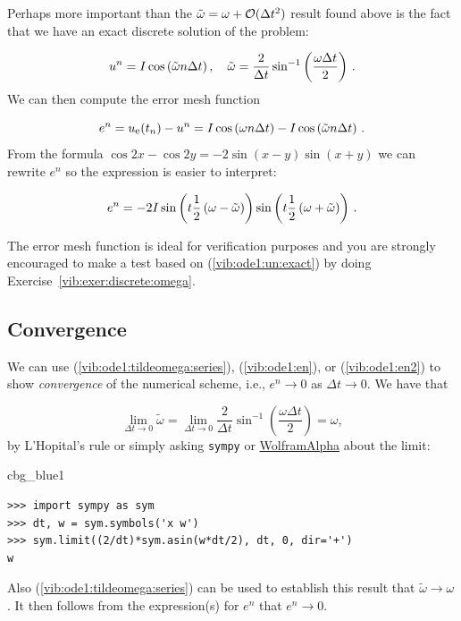 \documentclass[%
oneside,                 %
final,                   %
10pt]{article}
\newenvironment{_cod_tight}[1]{
   \def\FrameCommand{\colorbox{#1}}
   \FrameRule0.6pt\MakeFramed {\FrameRestore}\vskip3mm}
   {\vskip0mm\endMakeFramed}
\newenvironment{cod}[1]{
\bgroup\rmfamily
\fboxsep=0mm\relax
\begin{_cod_tight}{#1}
\list{}{\parsep=-2mm\parskip=0mm\topsep=0pt\leftmargin=2mm
\rightmargin=2\leftmargin\leftmargin=4pt\relax}
\item\relax}
{\endlist\end{_cod_tight}\egroup}
\begin{document}
Perhaps more important than the $\tilde\omega = \omega + {\cal O}(\Delta t^2)$
result found above is the fact that we have an exact discrete solution of
the problem:

\begin{equation}
u^n = I\cos\left(\tilde\omega n\Delta t\right),\quad
\tilde\omega = \frac{2}{\Delta t}\sin^{-1}\left(\frac{\omega\Delta t}{2}\right)
\tp
\label{vib:ode1:un:exact}
\end{equation}
We can then compute the error mesh function

\begin{equation}
e^n = \uex(t_n) - u^n =
I\cos\left(\omega n\Delta t\right) - I\cos\left(\tilde\omega n\Delta t\right)\tp
\label{vib:ode1:en}
\end{equation}
From the formula $\cos 2x - \cos 2y = -2\sin(x-y)\sin(x+y)$ we can
rewrite $e^n$ so the expression is easier to interpret:

\begin{equation}
e^n = -2I\sin\left(t\half\left( \omega - \tilde\omega\right)\right)
\sin\left(t\half\left( \omega + \tilde\omega\right)\right)\tp
\label{vib:ode1:en2}
\end{equation}

The error mesh function is ideal for verification purposes
and you are strongly encouraged to make a test based on (\ref{vib:ode1:un:exact})
by doing Exercise~\ref{vib:exer:discrete:omega}.


\subsection{Convergence}
\label{vib:ode1:analysis:conv}


We can use (\ref{vib:ode1:tildeomega:series}), (\ref{vib:ode1:en}), or
(\ref{vib:ode1:en2}) to show \emph{convergence} of the
numerical scheme, i.e., $e^n\rightarrow 0$ as $\Delta t\rightarrow 0$.
We have that

\[
\lim_{\Delta t\rightarrow 0}
\tilde\omega = \lim_{\Delta t\rightarrow 0}
\frac{2}{\Delta t}\sin^{-1}\left(\frac{\omega\Delta t}{2}\right)
= \omega,
\]
by L'Hopital's rule or simply asking \texttt{sympy} or
\href{{http://www.wolframalpha.com/input/?i=%282%2Fx%29*asin%28w*x%2F2%29+as+x-%3E0}}{WolframAlpha} about the limit:

\begin{cod}{cbg_blue1}\begin{Verbatim}[numbers=none,fontsize=\fontsize{9pt}{9pt},baselinestretch=0.95,xleftmargin=2mm]
>>> import sympy as sym
>>> dt, w = sym.symbols('x w')
>>> sym.limit((2/dt)*sym.asin(w*dt/2), dt, 0, dir='+')
w
\end{Verbatim}
\end{cod}
\noindent
Also (\ref{vib:ode1:tildeomega:series}) can be used to establish
this result that
$\tilde\omega\rightarrow\omega$. It then follows from the expression(s)
for $e^n$ that $e^n\rightarrow 0$.
\end{document}

